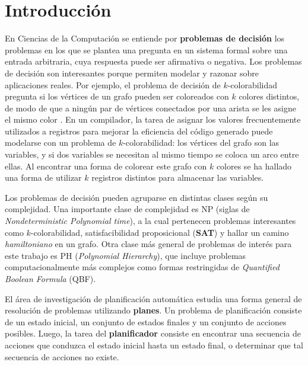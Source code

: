 
\chapter*{Introducción} %
\label{Intro}
En Ciencias de la Computación se entiende por \textbf{problemas de decisión}
los problemas en los que se plantea una pregunta en un sistema formal sobre una entrada
arbitraria, cuya respuesta puede ser afirmativa o negativa.
Los problemas de decisión son interesantes porque permiten modelar y razonar
sobre aplicaciones reales. Por ejemplo, el problema de decisión de
$k$-colorabilidad pregunta si los vértices de un grafo pueden ser coloreados
con $k$ colores distintos, de modo de que a ningún par de vértices conectados
por una arista se les asigne el mismo color . En un compilador, la tarea de
asignar los valores frecuentemente utilizados a registros para
mejorar la eficiencia del código generado puede modelarse con un problema de
$k$-colorabilidad: los vértices del grafo son las variables, y si dos variables
se necesitan al mismo tiempo se coloca un arco entre ellas. Al encontrar una
forma de colorear este grafo con $k$ colores se ha hallado una forma de
utilizar $k$ registros distintos para almacenar las variables.

Los problemas de decisión pueden agruparse en distintas clases según su
complejidad. Una importante clase de complejidad es NP (siglas de
\textit{Nondeterministic Polynomial time}), a la cual pertenecen problemas
interesantes como $k$-colorabilidad, satisfacibilidad proposicional
(\textbf{SAT}) y hallar un camino \textit{hamiltoniano} en un grafo. Otra clase
más general de problemas de interés para este trabajo es PH (\textit{Polynomial Hierarchy}),
que incluye problemas computacionalmente más complejos como formas restringidas de
\textit{Quantified Boolean Formula} (QBF).

El área de investigación de planificación automática estudia una forma general
de resolución de problemas utilizando \textbf{planes}. Un problema de planificación
consiste de un estado inicial, un conjunto de estados finales y un conjunto de
acciones posibles. Luego, la tarea del \textbf{planificador} 
consiste en encontrar una secuencia de acciones que conduzca
el estado inicial hasta un estado final, o determinar que tal secuencia de
acciones no existe.

